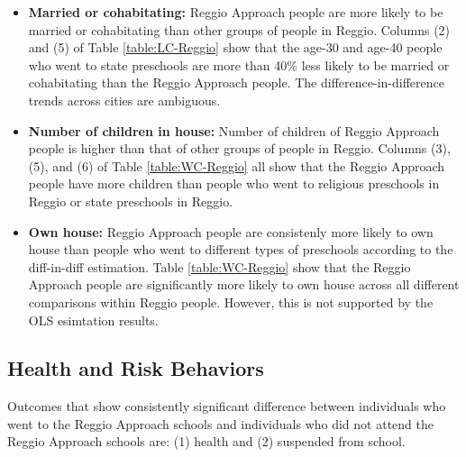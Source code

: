 \documentclass[11pt]{article}
\begin{document}
\begin{itemize}
\item \textbf{Married or cohabitating:} Reggio Approach people are more likely to be married or cohabitating than other groups of people in Reggio. Columns (2) and (5) of Table \ref{table:LC-Reggio} show that the age-30 and age-40 people who went to state preschools are more than 40\% less likely to be married or cohabitating than the Reggio Approach people. The difference-in-difference trends across cities are ambiguous.
\item \textbf{Number of children in house:} Number of children of Reggio Approach people is higher than that of other groups of people in Reggio. Columns (3), (5), and (6) of Table \ref{table:WC-Reggio} all show that the Reggio Approach people have more children than people who went to religious preschools in Reggio or state preschools in Reggio.
\item \textbf{Own house:} Reggio Approach people are consistenly more likely to own house than people who went to different types of preschools according to the diff-in-diff estimation. Table \ref{table:WC-Reggio} show that the Reggio Approach people are significantly more likely to own house across all different comparisons within Reggio people. However, this is not supported by the OLS esimtation results.
\end{itemize}


\subsection{Health and Risk Behaviors}
Outcomes that show consistently significant difference between individuals who went to the Reggio Approach schools and individuals who did not attend the Reggio Approach schools are: (1) health and (2) suspended from school.
\end{document}

